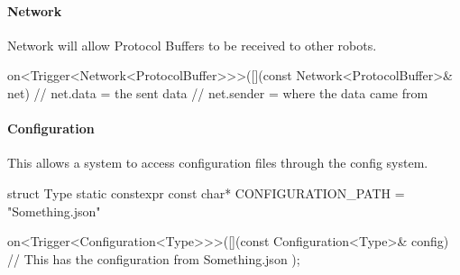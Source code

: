 \documentclass[a4paper]{article}
\begin{document}
	\paragraph{Network} Network will allow Protocol Buffers to be received to other robots.\\
	\begin{cppcode}
		on<Trigger<Network<ProtocolBuffer>>>([](const Network<ProtocolBuffer>& net) {
			// net.data = the sent data
			// net.sender = where the data came from
		}
	\end{cppcode}

	\paragraph{Configuration} This allows a system to access configuration files through the config system.\\
	\begin{cppcode}
		struct Type {
			static constexpr const char* CONFIGURATION_PATH = "Something.json"
		}

		on<Trigger<Configuration<Type>>>([](const Configuration<Type>& config) {
			// This has the configuration from Something.json
		});
	\end{cppcode}
\end{document}
